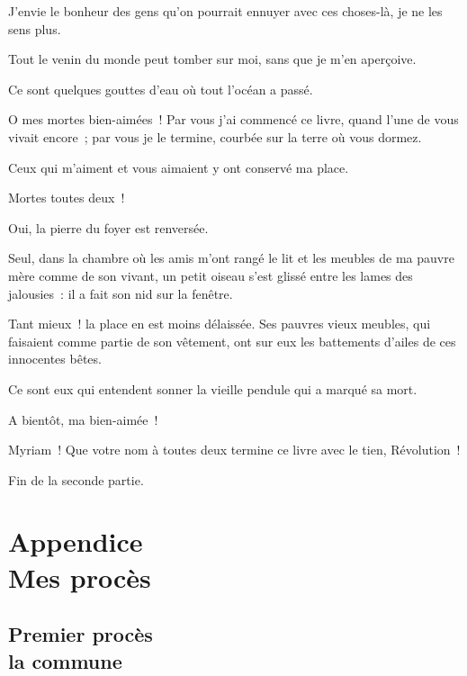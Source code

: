 \documentclass[french,twoside]{book} %
\newcommand{\astertri}{\medskip\par\centerline{\color{rubric}\large\selectfont{\syms ✻\,✻\,✻}}\medskip\par}%
\newcommand\chapteropen{} %
\newcommand\chaptercont{} %
\newcommand\chapterclose{} %
\begin{document}
J’envie le bonheur des gens qu’on pourrait ennuyer avec ces choses-là, je ne les sens plus.\par
Tout le venin du monde peut tomber sur moi, sans que je m’en aperçoive.\par
Ce sont quelques gouttes d’eau où tout l’océan a passé.\par
O mes mortes bien-aimées ! Par vous j’ai commencé ce livre, quand l’une de vous vivait encore ; par vous je le termine, courbée sur la terre où vous dormez.\par
Ceux qui m’aiment et vous aimaient y ont conservé ma place.\par
Mortes toutes deux !\par
Oui, la pierre du foyer est renversée.\par
Seul, dans la chambre où les amis m’ont rangé le lit et les meubles de ma pauvre mère comme de son vivant, un petit oiseau s’est glissé entre les lames des jalousies : il a fait son nid sur la fenêtre.\par
 Tant mieux ! la place en est moins délaissée. Ses pauvres vieux meubles, qui faisaient comme partie de son vêtement, ont sur eux les battements d’ailes de ces innocentes bêtes.\par
Ce sont eux qui entendent sonner la vieille pendule qui a marqué sa mort.\par
A bientôt, ma bien-aimée !\par
Myriam ! Que votre nom à toutes deux termine ce livre avec le tien, Révolution !\par


\begin{raggedleft}Fin de la seconde partie.\end{raggedleft}
 \chapterclose

\chapterclose


\chapteropen
 \part[{Appendice. Mes procès}]{Appendice \\
Mes procès}
\label{appendice}\renewcommand{\leftmark}{Appendice \\
Mes procès}

  
\chaptercont

\chapteropen

\chaptercont

\astertri

\chapter[{Premier procès, la commune}]{Premier procès \\
la commune}
\label{appendice.1}
\end{document}
